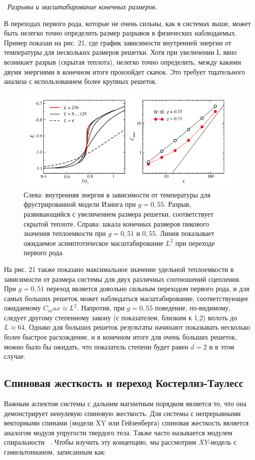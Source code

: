 \documentclass[11pt]{article}
\begin{document}
~\emph{Разрывы и масштабирование конечных размеров.}

В переходах первого рода, которые не очень сильны, как в системах выше, может быть нелегко точно определить размер разрывов в физических наблюдаемых. Пример показан на рис. 21, где график зависимости внутренней энергии от температуры для нескольких размеров решетки. Хотя при увеличении L явно возникает разрыв (скрытая теплота), нелегко точно определить, между какими двумя энергиями в конечном итоге произойдет скачок. Это требует тщательного анализа с использованием более крупных решеток.

\begin{figure}[htp]
\centering
\includegraphics[scale=0.5]{fig21}
\caption{Слева: внутренняя энергия в зависимости от температуры для фрустрированной модели Изинга при $g = 0,55$. Разрыв, развивающийся с увеличением размера решетки, соответствует скрытой теплоте. Справа: шкала конечных размеров пикового значения теплоемкости при $g = 0,51$ и $0,55$. Линия показывает ожидаемое асимптотическое масштабирование $L^2$ при переходе первого рода.}
\label{}
\end{figure}

На рис. 21 также показано максимальное значение удельной теплоемкости в зависимости от размера системы для двух различных соотношений сцепления. При $g = 0,51$ переход является довольно сильным переходом первого рода, и для самых больших решеток может наблюдаться масштабирование, соответствующее ожидаемому $C_max \approx L^2$. Напротив, при $g = 0,55$ поведение, по-видимому, следует другому степенному закону (с показателем, близким к 1,2) вплоть до $L \approx 64$. Однако для больших решеток результаты начинают показывать несколько более быстрое расхождение, и в конечном итоге для очень больших решеток, можно было бы ожидать, что показатель степени будет равен $d = 2$ и в этом случае.

\subsection{Спиновая жесткость и переход Костерлиз-Таулесс}
Важным аспектом системы с дальним магнитным порядком является то, что она демонстрирует ненулевую спиновую жесткость. Для системы с непрерывными векторными спинами (модели XY или Гейзенберга) спиновая жесткость является аналогом модуля упругости твердого тела. Также часто называется модулем спиральности ~\cite{pra_8_1111}. 
Чтобы изучить эту концепцию, мы рассмотрим $XY$-модель с гамильтонианом, записанным  как:
\end{document}
